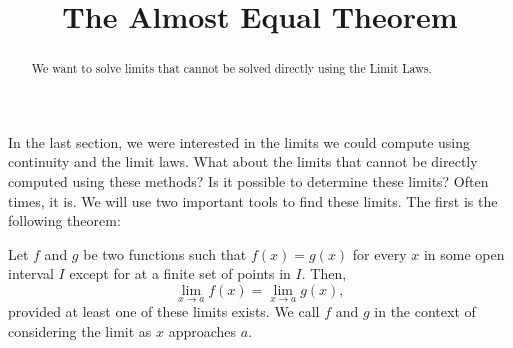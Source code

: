 \documentclass{ximera}
\title[Dig-In:]{The Almost Equal Theorem}
\begin{document}
\begin{abstract}
  We want to solve limits that cannot be solved directly using the
  Limit Laws.
\end{abstract}

\maketitle


In the last section, we were interested in the limits we could compute
using continuity and the limit laws. What about the limits that cannot
be directly computed using these methods?  Is it possible to determine
these limits?  Often times, it is.  We will use two important tools to
find these limits.  The first is the following theorem:

\begin{theorem}
Let $f$ and $g$ be two functions such that $f(x)=g(x)$ for every $x$
in some open interval $I$ except for at a finite set of points in $I$.
Then,
\[
\lim_{x\to a} f(x)= \lim_{x\to a} g(x),
\]
provided at least one of these limits exists.  We call $f$ and $g$
 in the context of considering the limit
as $x$ approaches $a$.
\end{theorem}
\end{document}
